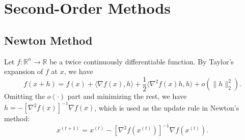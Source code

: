 \documentclass[openany]{book}
\newtheorem{lemma}{Lemma}[chapter]
\newtheorem{theorem}{Theorem}[chapter]
\theoremstyle{definition}
\theoremstyle{remark}
\begin{document}
\begin{comment}
\section{The Ellipsoid Method}
In this chapter, we further assume that $C$ is contained in a ball of radius $R$, and contains a ball of radius $r$.

Recall that an ellipsoid is given by $\mathcal{E}=\{x\in \mathbb{R}^n|(x-c)^{\mathrm{T}}H^{-1}(x-c)\le1\}$, where $c\in \mathbb{R}^n$ is the center. The ellipsoid method is based on the following geometric lemma:
\begin{lemma}[\cite{B14} Lemma 2.3]
    Let $\mathcal{E}_0=\{x\in \mathbb{R}^n|(x-c_0)^{\mathrm{T}}H_0^{-1}(x-c_0)\le1\}$. For any $w\ne0$, there exists an ellipsoid $\mathcal{E}$ such that $\mathcal{E}\supset\{x\in \mathcal{E}_0|\langle x-c_0,w\rangle\le0\}$, and $\mathbf{vol}\,\mathcal{E}\le\exp(-\frac{1}{2n})\mathbf{vol}\,\mathcal{E}_0$.
\end{lemma}

The basic idea is similar to the center of gravity method. However, we replace the center of gravity with the center of surrounding ellipsoid, which can be computed much more efficiently. We have the following guarantee:
\begin{theorem}\label{ellipsoidMethod}
    For $t\ge2n^2\ln \frac{R}{r}$ we have $\{c_1,c_2,\ldots,c_t\}\cap C\ne\emptyset$, and $f(x_t)-f(x^{\star})\le \frac{2BR}{r}\exp(-\frac{t}{2n^2})$.
\end{theorem}

\paragraph{Remark}
The running time now becomes $O(n^2\log \frac{1}{\epsilon})$, which is worse than the center of gravity method. However, as metioned before, the computational cost each step is much cheaper.
\end{comment}

\part{Second-Order Methods}
\chapter{Newton Method}
Let $f:\mathbb{R}^n\to \mathbb{R}$ be a twice continuously differentiable function. By Taylor's expansion of $f$ at $x$, we have
\begin{equation}
    f(x+h)=f(x)+\langle\nabla f(x),h\rangle+\frac{1}{2}\langle\nabla^2f(x)h,h\rangle+o(\|h\|_2^2).
\end{equation}
Omitting the $o(\cdot)$ part and minimizing the rest, we have $h=-[\nabla^2f(x)]^{-1}\nabla f(x)$, which is used as the update rule in Newton's method:
\begin{equation}
    x^{(t+1)}=x^{(t)}-[\nabla^2f(x^{(t)})]^{-1}\nabla f(x^{(t)}).
\end{equation}
\end{document}
